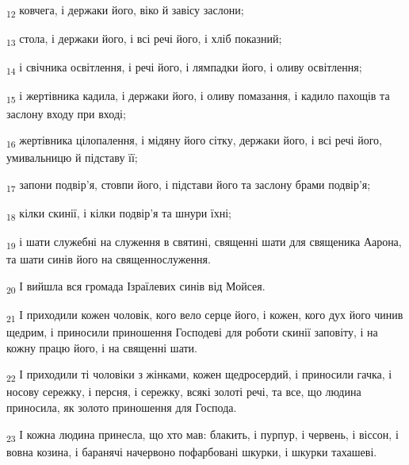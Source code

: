 \begin{tcolorbox}
\textsubscript{12} ковчега, і держаки його, віко й завісу заслони;
\end{tcolorbox}
\begin{tcolorbox}
\textsubscript{13} стола, і держаки його, і всі речі його, і хліб показний;
\end{tcolorbox}
\begin{tcolorbox}
\textsubscript{14} і свічника освітлення, і речі його, і лямпадки його, і оливу освітлення;
\end{tcolorbox}
\begin{tcolorbox}
\textsubscript{15} і жертівника кадила, і держаки його, і оливу помазання, і кадило пахощів та заслону входу при вході;
\end{tcolorbox}
\begin{tcolorbox}
\textsubscript{16} жертівника цілопалення, і мідяну його сітку, держаки його, і всі речі його, умивальницю й підставу її;
\end{tcolorbox}
\begin{tcolorbox}
\textsubscript{17} запони подвір'я, стовпи його, і підстави його та заслону брами подвір'я;
\end{tcolorbox}
\begin{tcolorbox}
\textsubscript{18} кілки скинії, і кілки подвір'я та шнури їхні;
\end{tcolorbox}
\begin{tcolorbox}
\textsubscript{19} і шати служебні на служення в святині, священні шати для священика Аарона, та шати синів його на священнослуження.
\end{tcolorbox}
\begin{tcolorbox}
\textsubscript{20} І вийшла вся громада Ізраїлевих синів від Мойсея.
\end{tcolorbox}
\begin{tcolorbox}
\textsubscript{21} І приходили кожен чоловік, кого вело серце його, і кожен, кого дух його чинив щедрим, і приносили приношення Господеві для роботи скинії заповіту, і на кожну працю його, і на священні шати.
\end{tcolorbox}
\begin{tcolorbox}
\textsubscript{22} І приходили ті чоловіки з жінками, кожен щедросердий, і приносили гачка, і носову сережку, і персня, і сережку, всякі золоті речі, та все, що людина приносила, як золото приношення для Господа.
\end{tcolorbox}
\begin{tcolorbox}
\textsubscript{23} І кожна людина принесла, що хто мав: блакить, і пурпур, і червень, і віссон, і вовна козина, і баранячі начервоно пофарбовані шкурки, і шкурки тахашеві.
\end{tcolorbox}
